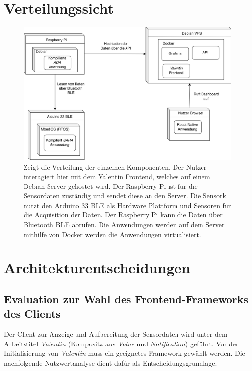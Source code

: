 \documentclass[
]{article}
\begin{document}
\section{Verteilungssicht}

\begin{figure}[H]
	\centering
	\includegraphics[width=170mm]{resources/Verteilungssicht_Deployment.png}
	\caption{Zeigt die Verteilung der einzelnen Komponenten. Der Nutzer interagiert hier mit dem Valentin Frontend, welches auf einem Debian Server gehostet wird. Der Raspberry Pi ist für die Sensordaten zuständig und sendet diese an den Server. Die Sensork nutzt den Arduino 33 BLE als Hardware Plattform und Sensoren für die Acquisition der Daten. Der Raspberry Pi kann die Daten über Bluetooth BLE abrufen. Die Anwendungen werden auf dem Server mithilfe von Docker werden die Anwendungen virtualisiert.}
	\label{fig:Qualitätsbaum}
\end{figure}  

\section{Architekturentscheidungen}
\subsection{Evaluation zur Wahl des Frontend-Frameworks des Clients}

Der Client zur Anzeige und Aufbereitung der Sensordaten wird unter dem Arbeitstitel \textit{Valentin} (Komposita aus \textit{Value} und \textit{Notification}) geführt. Vor der Initialisierung von \textit{Valentin} muss ein geeignetes Framework gewählt werden. Die nachfolgende Nutzwertanalyse dient dafür als Entscheidungsgrundlage. 
\end{document}
